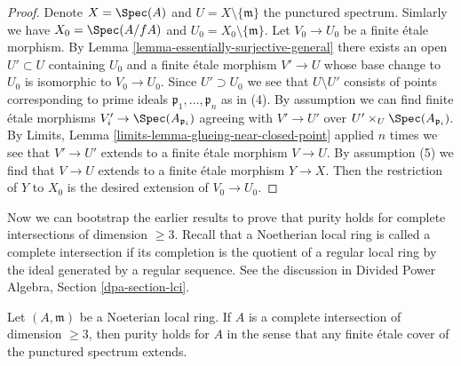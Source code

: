 \begin{proof}
Denote $X = \Spec(A)$ and $U = X \setminus \{\mathfrak m\}$
the punctured spectrum. Simlarly we have $X_0 = \Spec(A/fA)$
and $U_0 = X_0 \setminus \{\mathfrak m\}$.
Let $V_0 \to U_0$ be a finite \'etale morphism. By
Lemma \ref{lemma-essentially-surjective-general}
there exists an open $U' \subset U$ containing $U_0$ and
a finite \'etale morphism $V' \to U$ whose base change to $U_0$
is isomorphic to $V_0 \to U_0$. Since $U' \supset U_0$
we see that $U \setminus U'$ consists of points corresponding
to prime ideals $\mathfrak p_1, \ldots, \mathfrak p_n$ as in (4).
By assumption we can find finite \'etale morphisms
$V'_i \to \Spec(A_{\mathfrak p_i})$ agreeing with
$V' \to U'$ over $U' \times_U \Spec(A_{\mathfrak p_i})$.
By Limits, Lemma \ref{limits-lemma-glueing-near-closed-point}
applied $n$ times we see that $V' \to U'$ extends to a finite \'etale
morphism $V \to U$. By assumption (5) we find that $V \to U$ extends
to a finite \'etale morphism $Y \to X$. Then the restriction of
$Y$ to $X_0$ is the desired extension of $V_0 \to U_0$.
\end{proof}

\noindent
Now we can bootstrap the earlier results to prove that
purity holds for complete intersections of dimension $\geq 3$.
Recall that a Noetherian local ring is called a complete
intersection if its completion is the quotient of a
regular local ring by the ideal generated by a regular sequence.
See the discussion in Divided Power Algebra, Section \ref{dpa-section-lci}.

\begin{proposition}
\label{proposition-purity-complete-intersection}
Let $(A, \mathfrak m)$ be a Noeterian local ring. If $A$ is a
complete intersection of dimension $\geq 3$, then purity
holds for $A$ in the sense that any finite \'etale cover of
the punctured spectrum extends.
\end{proposition}

